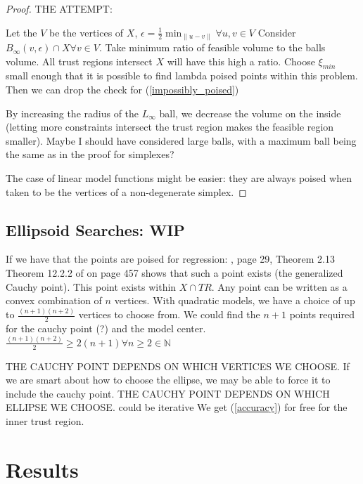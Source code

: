 \documentclass{article}
\theoremstyle{case}
\newcommand{\domain}{X}
\let\oldref\ref
\renewcommand{\ref}[1]{(\oldref{#1})}
\begin{document}
\begin{proof}

THE ATTEMPT:

Let the $V$ be the vertices of $\domain$, $\epsilon = \frac 1 2 \min_{\|u - v\|} \forall u,v \in V$
Consider $B_{\infty}(v, \epsilon) \cap \domain \forall v \in V$.
Take minimum ratio of feasible volume to the balls volume.
\color{red}All trust regions intersect $\domain$ will have this high a ratio.\color{black}
Choose $\xi_{min}$ small enough that it is possible to find lambda poised points within this problem.
Then we can drop the check for \ref{impossibly_poised}

By increasing the radius of the $L_{\infty}$ ball, we decrease the volume on the inside (letting more constraints intersect the trust region makes the feasible region smaller).
Maybe I should have considered large balls, with a maximum ball being the same as in the proof for simplexes?

The case of linear model functions might be easier: they are always poised when taken to be the vertices of a non-degenerate simplex.

\end{proof}

\subsection{Ellipsoid Searches: WIP}

If we have that the points are poised for regression: \cite{DUMMY:intro_book}, page 29, Theorem 2.13
Theorem 12.2.2 of \cite{Conn:2000:TM:357813} on page 457 shows that such a point exists (the generalized Cauchy point).
This point exists within $\domain \cap TR$.
Any point can be written as a convex combination of $n$ vertices.
With quadratic models, we have a choice of up to $\frac{(n+1)(n+2)}{2}$ vertices to choose from.
We could find the $n+1$ points required for the cauchy point (?) and the model center.
$\frac{(n+1)(n+2)}{2} \ge 2(n+1)\forall n\ge 2 \in \mathbb N$

THE CAUCHY POINT DEPENDS ON WHICH VERTICES WE CHOOSE.
If we are smart about how to choose the ellipse, we may be able to force it to include the cauchy point.
THE CAUCHY POINT DEPENDS ON WHICH ELLIPSE WE CHOOSE.
could be iterative
We get \ref{accuracy} for free for the inner trust region.
\color{black}


\section{Results}
\end{document}
